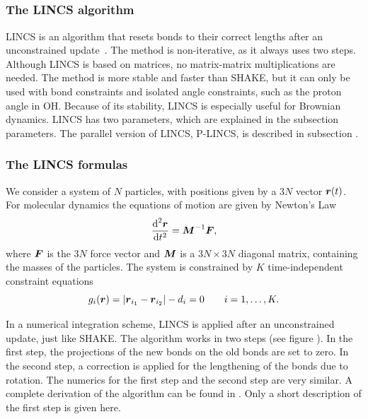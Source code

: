 



\newcommand{\fs}[1]{\begin{equation} \label{eqn:#1}}
\newcommand{\fe}{\end{equation}}
\newcommand{\p}{\partial}
\newcommand{\Bm}{\ve{B}}
\newcommand{\M}{\ve{M}}
\newcommand{\iM}{\M^{-1}}
\newcommand{\Tm}{\ve{T}}
\newcommand{\Sm}{\ve{S}}
\newcommand{\fo}{\ve{f}}
\newcommand{\con}{\ve{g}}
\newcommand{\lenc}{\ve{d}}

\subsection{}
\label{subsec:lincs}

\subsubsection{The LINCS algorithm}
LINCS is an algorithm that resets bonds to their correct lengths
after an unconstrained update~\cite{Hess97}. 
The method is non-iterative, as it always uses two steps.
Although LINCS is based on matrices, no matrix-matrix multiplications are 
needed. The method is more stable and faster than SHAKE, 
but it can only be used with bond constraints and 
isolated angle constraints, such as the proton angle in OH. 
Because of its stability, LINCS is especially useful for Brownian dynamics. 
LINCS has two parameters, which are explained in the subsection parameters.
The parallel version of LINCS, P-LINCS, is described
in subsection .
 
\subsubsection{The LINCS formulas}
We consider a system of $N$ particles, with positions given by a
$3N$ vector $\ve{r}(t)$.
For molecular dynamics the equations of motion are given by Newton's Law
\fs{c1}
{\de^2 \ve{r} \over \de t^2} = \iM \ve{F},
\fe
where $\ve{F}$ is the $3N$ force vector 
and $\M$ is a $3N \times 3N$ diagonal matrix,
containing the masses of the particles.
The system is constrained by $K$ time-independent constraint equations
\fs{c2}
g_i(\ve{r}) = | \ve{r}_{i_1}-\ve{r}_{i_2} | - d_i = 0 ~~~~~~i=1,\ldots,K.
\fe

In a numerical integration scheme, LINCS is applied after an
unconstrained update, just like SHAKE. The algorithm works in two
steps (see figure ). In the first step, the projections
of the new bonds on the old bonds are set to zero. In the second step,
a correction is applied for the lengthening of the bonds due to
rotation. The numerics for the first step and the second step are very
similar. A complete derivation of the algorithm can be found in
\cite{Hess97}. Only a short description of the first step is given
here.

